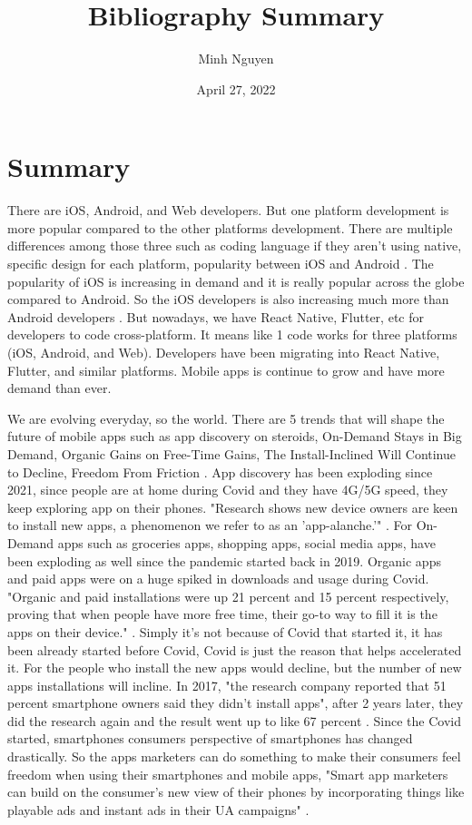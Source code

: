 \documentclass{article}
\title{Bibliography Summary}
\author{Minh Nguyen}
\date{April 27, 2022}
\begin{document}
\maketitle

\section*{Summary}
There are iOS, Android, and Web developers. But one platform development is more popular compared to the other platforms development. There are multiple differences among those three such as coding language if they aren't using native, specific design for each platform, popularity between iOS and Android \cite{Ego21}. The popularity of iOS is increasing in demand and it is really popular across the globe compared to Android. So the iOS developers is also increasing much more than Android developers \cite{Ego21}. But nowadays, we have React Native, Flutter, etc for developers to code cross-platform. It means like 1 code works for three platforms (iOS, Android, and Web). Developers have been migrating into React Native, Flutter, and similar platforms. Mobile apps is continue to grow and have more demand than ever.

\medskip
We are evolving everyday, so the world. There are 5 trends that will shape the future of mobile apps such as app discovery on steroids, On-Demand Stays in Big Demand, Organic Gains on Free-Time Gains, The Install-Inclined Will Continue to Decline, Freedom From Friction \cite{Jon21}. App discovery has been exploding since 2021, since people are at home during Covid and they have 4G/5G speed, they keep exploring app on their phones. "Research shows new device owners are keen to install new apps, a phenomenon we refer to as an 'app-alanche.'" \cite{Jon21}. For On-Demand apps such as groceries apps, shopping apps, social media apps, have been exploding as well since the pandemic started back in 2019. Organic apps and paid apps were on a huge spiked in downloads and usage during Covid. "Organic and paid installations were up 21 percent and 15 percent respectively, proving that when people have more free time, their go-to way to fill it is the apps on their device." \cite{Jon21}. Simply it's not because of Covid that started it, it has been already started before Covid, Covid is just the reason that helps accelerated it. For the people who install the new apps would decline, but the number of new apps installations will incline. In 2017, "the research company reported that 51 percent smartphone owners said they didn’t install apps", after 2 years later, they did the research again and the result went up to like 67 percent \cite{Jon21}. Since the Covid started, smartphones consumers perspective of smartphones has changed drastically. So the apps marketers can do something to make their consumers feel freedom when using their smartphones and mobile apps, "Smart app marketers can build on the consumer’s new view of their phones by incorporating things like playable ads and instant ads in their UA campaigns" \cite{Jon21}.





\printbibliography
\end{document}
